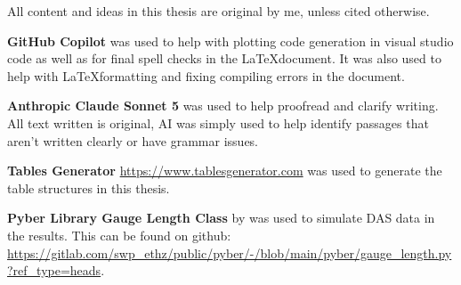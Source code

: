 \begin{appendices}
All content and ideas in this thesis are original by me, unless cited otherwise. \par 

\textbf{GitHub Copilot} was used to help with plotting code generation in visual studio code as well as for final spell checks in the \LaTeX document. It was also used to help with \LaTeX formatting and fixing compiling errors in the document. \par

\textbf{Anthropic Claude Sonnet 5} was used to help proofread and clarify writing. All text written is original, AI was simply used to help identify passages that aren't written clearly or have grammar issues.\par 

\textbf{Tables Generator} \url{https://www.tablesgenerator.com} was used to generate the table structures in this thesis. \par

\textbf{Pyber Library Gauge Length Class} by \cite{noeFrontiersFullwaveformSeismology2025} was used to simulate DAS data in the results. This can be found on github: \url{https://gitlab.com/swp_ethz/public/pyber/-/blob/main/pyber/gauge_length.py?ref_type=heads}. \par


\end{appendices}
